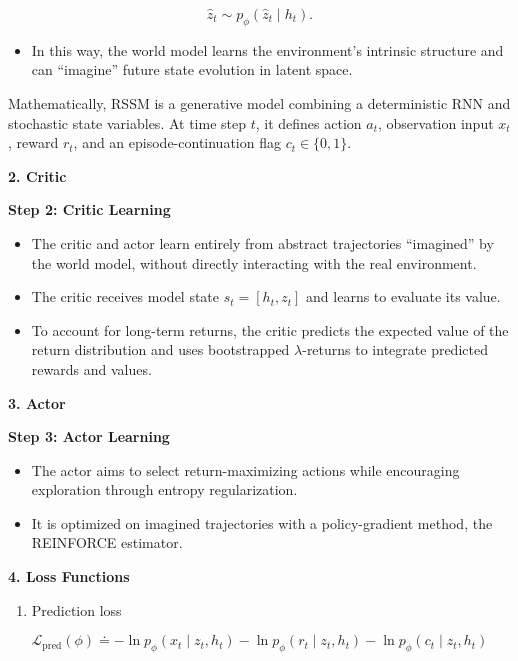 \[
\hat{z}_t \sim p_{\phi}(\hat{z}_t \mid h_t).
\]

\begin{itemize}
\tightlist
\item
  In this way, the world model learns the environment's intrinsic structure and can ``imagine'' future state evolution in latent space.
\end{itemize}

Mathematically, RSSM is a generative model combining a deterministic RNN and stochastic state variables. At time step \(t\), it defines action \(a_t\), observation input \(x_t\), reward \(r_t\), and an episode-continuation flag \(c_t \in \{0, 1\}\).

\textbf{2. Critic}

\textbf{Step 2: Critic Learning}

\begin{itemize}
\tightlist
\item
  The critic and actor learn entirely from abstract trajectories ``imagined'' by the world model, without directly interacting with the real environment.
\item
  The critic receives model state \(s_t = [h_t, z_t]\) and learns to evaluate its value.
\item
  To account for long-term returns, the critic predicts the expected value of the return distribution and uses bootstrapped \(\lambda\)-returns to integrate predicted rewards and values.
\end{itemize}

\textbf{3. Actor}

\textbf{Step 3: Actor Learning}

\begin{itemize}
\tightlist
\item
  The actor aims to select return-maximizing actions while encouraging exploration through entropy regularization.
\item
  It is optimized on imagined trajectories with a policy-gradient method, the REINFORCE estimator.
\end{itemize}

\textbf{4. Loss Functions}

\begin{enumerate}
\def\labelenumi{(\arabic{enumi})}
\tightlist
\item
  Prediction loss
\end{enumerate}

\[
\mathcal{L}_{\mathrm{pred}}(\phi)
\doteq
-\ln p_{\phi}(x_t \mid z_t, h_t)
-\ln p_{\phi}(r_t \mid z_t, h_t)
-\ln p_{\phi}(c_t \mid z_t, h_t)
\]

